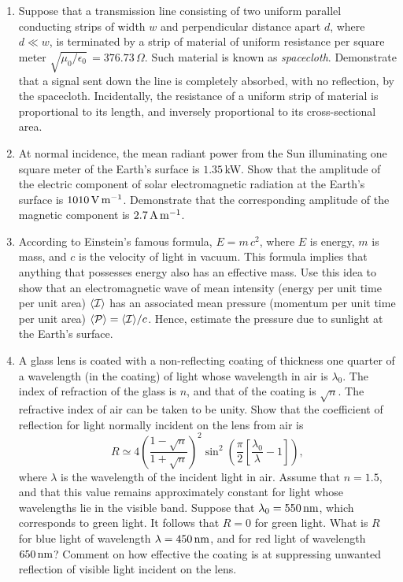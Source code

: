 {\begin{enumerate}
\item Suppose that a transmission line consisting of two uniform parallel
conducting strips of width $w$ and perpendicular distance apart $d$, where
$d\ll w$, is terminated by a strip of material of uniform resistance per square
meter $\sqrt{\mu_0/\epsilon_0}\,=376.73\,\Omega$. Such material is known
as {\em spacecloth}. Demonstrate that a signal sent down the line is
completely absorbed, with no reflection, by the spacecloth. Incidentally, the
resistance of a uniform strip of material is proportional to its length, and
inversely proportional to its cross-sectional area.

\item At normal incidence, the mean radiant power from the Sun illuminating one square meter  of the Earth's surface is $1.35$\,kW. Show that the amplitude of the
electric component of solar electromagnetic radiation at the
Earth's surface is $1010\,{\rm V}\,{\rm m}^{-1}$. Demonstrate that the
corresponding amplitude of the magnetic component is $2.7\,{\rm A}\,{\rm m}^{-1}$. 

\item According to Einstein's famous formula, $E=m\,c^2$, where $E$ is energy,
$m$ is mass, and $c$ is the velocity of light in vacuum. This formula implies that
anything that possesses energy also has an effective mass. Use this idea to show
that an electromagnetic wave of mean intensity (energy per unit time per unit area)
$\langle {\cal I}\rangle$ has an associated mean pressure (momentum per unit
time per unit area) $\langle {\cal P}\rangle = \langle {\cal I}\rangle/c$. Hence,
estimate the pressure due to sunlight at the Earth's surface. 

\item A glass lens is coated with a non-reflecting coating of thickness
one quarter of a wavelength (in the coating)  of light whose 
wavelength in air is $\lambda_0$. The index of refraction of the glass is $n$, and that
of the coating is $\sqrt{n}$. The refractive index of air can be taken to be unity. Show that the coefficient of reflection for light normally incident on the lens from air is
$$
R \simeq 4\left(\frac{1-\sqrt{n}}{1+\sqrt{n}}\right)^2\sin^2\left(\frac{\pi}{2}\left[\frac{\lambda_0}{\lambda}-1\right]\right),
$$
where $\lambda$ is the wavelength of the incident light in air. Assume that $n=1.5$, and  that this value remains approximately constant for light whose wavelengths lie in  the visible band.
Suppose that $\lambda_0 = 550\,{\rm nm}$, which corresponds to green light.
It follows that $R=0$ for green light. What is $R$ for blue light of wavelength
$\lambda=450\,{\rm nm}$, and for red light of wavelength $650\,{\rm nm}$? Comment
on how effective the coating is at suppressing unwanted reflection of visible light incident
on the lens.


\end{enumerate}}
